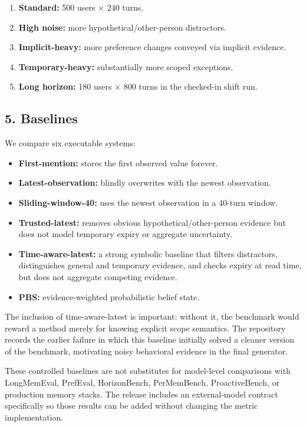 \begin{enumerate}
\def\labelenumi{\arabic{enumi}.}
\tightlist
\item
  \textbf{Standard:} 500 users × 240 turns.
\item
  \textbf{High noise:} more hypothetical/other-person distractors.
\item
  \textbf{Implicit-heavy:} more preference changes conveyed via implicit
  evidence.
\item
  \textbf{Temporary-heavy:} substantially more scoped exceptions.
\item
  \textbf{Long horizon:} 180 users × 800 turns in the checked-in shift
  run.
\end{enumerate}

\subsection{5. Baselines}\label{baselines}

We compare six executable systems:

\begin{itemize}
\tightlist
\item
  \textbf{First-mention:} stores the first observed value forever.
\item
  \textbf{Latest-observation:} blindly overwrites with the newest
  observation.
\item
  \textbf{Sliding-window-40:} uses the newest observation in a 40-turn
  window.
\item
  \textbf{Trusted-latest:} removes obvious hypothetical/other-person
  evidence but does not model temporary expiry or aggregate uncertainty.
\item
  \textbf{Time-aware-latest:} a strong symbolic baseline that filters
  distractors, distinguishes general and temporary evidence, and checks
  expiry at read time, but does not aggregate competing evidence.
\item
  \textbf{PBS:} evidence-weighted probabilistic belief state.
\end{itemize}

The inclusion of time-aware-latest is important: without it, the
benchmark would reward a method merely for knowing explicit scope
semantics. The repository records the earlier failure in which this
baseline initially solved a cleaner version of the benchmark, motivating
noisy behavioral evidence in the final generator.

These controlled baselines are not substitutes for model-level
comparisons with LongMemEval, PrefEval, HorizonBench, PerMemBench,
ProactiveBench, or production memory stacks. The release includes an
external-model contract specifically so those results can be added
without changing the metric implementation.

